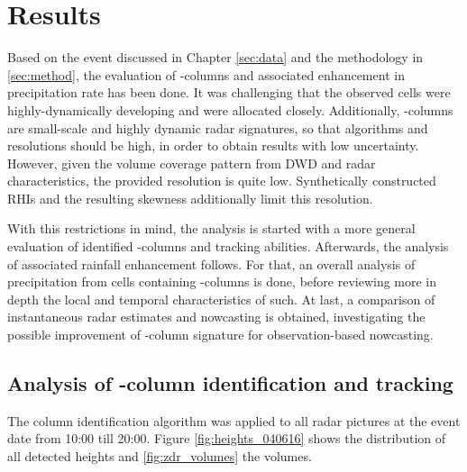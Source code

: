 
\chapter{Results}
\label{sec:results}
Based on the event discussed in Chapter \ref{sec:data} and the methodology in \ref{sec:method}, the evaluation of \zdr-columns and associated enhancement in precipitation rate has been done. It was challenging that the observed cells were highly-dynamically developing and were allocated closely. Additionally, \zdr-columns are small-scale and highly dynamic radar signatures, so that algorithms and resolutions should be high, in order to obtain results with low uncertainty.
However, given the volume coverage pattern from DWD and radar characteristics, the provided resolution is quite low. Synthetically constructed RHIs and the resulting skewness additionally limit this resolution. 

With this restrictions in mind, the analysis is started with a more general evaluation of identified \zdr-columns and tracking abilities. Afterwards, the analysis of associated rainfall enhancement follows. For that, an overall analysis of precipitation from cells containing \zdr-columns is done, before reviewing more in depth the local and temporal characteristics of such.
At last, a comparison of instantaneous radar estimates and nowcasting is obtained, investigating the possible improvement of \zdr-column signature for observation-based nowcasting.

\section{Analysis of \zdr-column identification and tracking}
The column identification algorithm was applied to all radar pictures at the event date from 10:00 till 20:00. 
Figure \ref{fig:heights_040616} shows the distribution of all detected heights and \ref{fig:zdr_volumes} the volumes.

